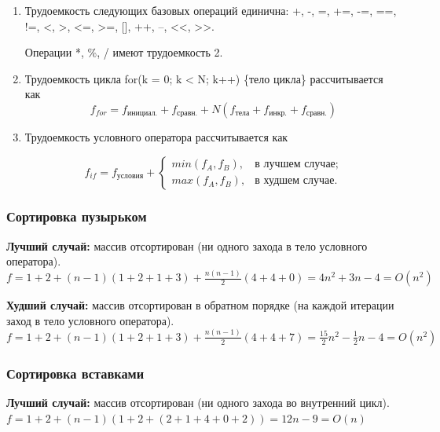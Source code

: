 \begin{enumerate}

	\item Трудоемкость следующих базовых операций единична:
	+, -, =, +=, -=, ==, !=, <, >, <=, >=, [], ++, --, <<, >>.
	
	Операции *, \%, / имеют трудоемкость 2.
	
	\item Трудоемкость цикла for(k = 0; k < N; k++) \{тело цикла\} рассчитывается как
	\begin{equation}
		\label{for:for}
		f_{for} = f_{\text{инициал.}} + f_{\text{сравн.}} + N(f_{\text{тела}} + f_{\text{инкр.}} + f_{\text{сравн.}})
	\end{equation}
	
	\item Трудоемкость условного оператора  рассчитывается как
	
	\begin{equation}
		\label{for:if}
		f_{if} = f_{\text{условия}} +
		\begin{cases}
			min(f_A, f_B), & \text{в лучшем случае;}\\
			max(f_A, f_B), & \text{в худшем случае.}
		\end{cases}
	\end{equation}
	
\end{enumerate}


\subsubsection{Сортировка пузырьком}

\textbf{Лучший случай:} массив отсортирован (ни одного захода в тело условного оператора).\newline
$f = 1 + 2 + (n - 1)(1 + 2 + 1 + 3) + \frac{n(n - 1)}{2}(4 + 4 + 0) = 4n^2 + 3n - 4 = O(n^2) $

\textbf{Худший случай:}  массив отсортирован в обратном порядке (на каждой итерации заход в тело условного оператора).\newline
$f = 1 + 2 + (n - 1)(1 + 2 + 1 + 3) + \frac{n(n - 1)}{2}(4 + 4 + 7) = \frac{15}{2}n^2 - \frac{1}{2}n - 4 = O(n^2) $


\subsubsection{Сортировка вставками}

\textbf{Лучший случай:} массив отсортирован (ни одного захода во внутренний цикл).\newline
$f = 1 + 2 + (n - 1)(1 + 2 + (2 + 1 + 4 + 0 + 2)) = 12n - 9 = O(n) $

